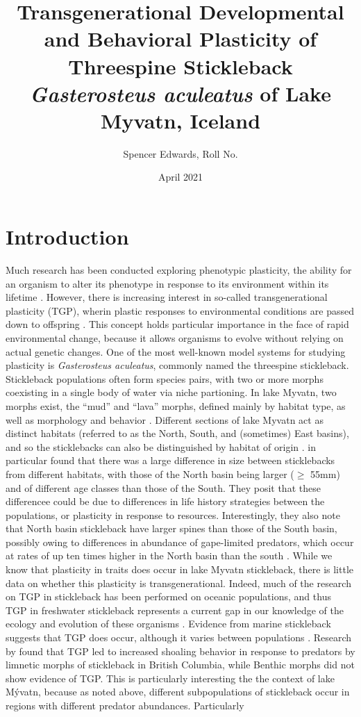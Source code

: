 \documentclass[12pt]{extarticle}
\title{Transgenerational Developmental and Behavioral Plasticity of Threespine Stickleback \textit{Gasterosteus aculeatus} of Lake Myvatn, Iceland}
\author{Spencer Edwards, Roll No.}
\date{April 2021}
\begin{document}
\maketitle

\section*{Introduction}
Much research has been conducted exploring phenotypic plasticity, the ability for an organism to alter its phenotype in response to its environment within its lifetime \citep{Denver2010, Kishida2010, Klemetsen2010}. However, there is increasing interest in so-called transgenerational plasticity (TGP), wherin plastic responses to environmental conditions are passed down to offspring \citep{Hellmann2020, Richter-Boix2014, Bell2019, Shama2014}. This concept holds particular importance in the face of rapid environmental change, because it allows organisms to evolve without relying on actual genetic changes. One of the most well-known model systems for studying plasticity is \textit{Gasterosteus aculeatus}, commonly named the threespine stickleback. Stickleback populations often form species pairs, with two or more morphs coexisting in a single body of water via niche partioning. In lake Myvatn, two morphs exist, the ``mud'' and ``lava'' morphs, defined mainly by habitat type, as well as morphology and behavior \citep{Kristjansson2002, Millet2013}. Different sections of lake Myvatn act as distinct habitats (referred to as the North, South, and (sometimes) East basins), and so the sticklebacks can also be distinguished by habitat of origin \citep{Millet2013, Einarsson2004}. \citet{Millet2013} in particular found that there was a large difference in size between sticklebacks from different habitats, with those of the North basin being larger ($\ge$ 55mm) and of different age classes than those of the South. They posit that these differencee could be due to differences in life history strategies between the populations, or plasticity in response to resources. Interestingly, they also note that North basin stickleback have larger spines than those of the South basin, possibly owing to differences in abundance of gape-limited predators, which occur at rates of up ten times higher in the North basin than the south \citep{Millet2013}. While we know that plasticity in traits does occur in lake Myvatn stickleback, there is little data on whether this plasticity is transgenerational. Indeed, much of the research on TGP in stickleback has been performed on oceanic populations, and thus TGP in freshwater stickleback represents a current gap in our knowledge of the ecology and evolution of these organisms \citep{Shama2014}. Evidence from marine stickleback suggests that TGP does occur, although it varies between populations \citep{Shama2014, Heckwolf2018, Kozak2012}. Research by \citet{Kozak2012} found that TGP led to increased shoaling behavior in response to predators by limnetic morphs of stickleback in British Columbia, while Benthic morphs did not show evidence of TGP. This is particularly interesting the the context of lake M\'yvatn, because as noted above, different subpopulations of stickleback occur in regions with different predator abundances. Particularly 
\end{document}
